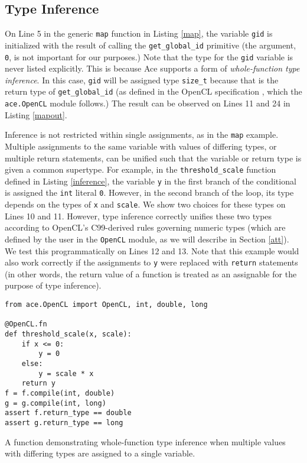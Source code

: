 \documentclass[10pt, conference, compsocconf]{IEEEtran}
\begin{document}
\subsection{Type Inference}
On Line 5 in the generic \verb|map| function in Listing \ref{map}, the variable \verb|gid| is initialized with the result of calling the \verb|get_global_id| primitive (the argument, \verb|0|, is not important for our purposes.)  Note that the type for the \verb|gid| variable is never listed explicitly. This is because Ace supports a form of {\em whole-function type inference}. In this case, \verb|gid| will be assigned type \verb|size_t| because that is the return type of \verb|get_global_id| (as defined in the OpenCL specification \cite{opencl}, which the \verb|ace.OpenCL| module follows.) The result can be observed on Lines 11 and 24 in Listing \ref{mapout}. 

Inference is not restricted within single assignments, as in the \verb|map| example. Multiple assignments to the same variable with values of differing types, or multiple return statements, can be unified such that the variable or return type is given a common supertype. For example, in the \verb|threshold_scale| function defined in Listing \ref{inference}, the variable \verb|y| in the first branch of the conditional is assigned the \verb|int| literal \verb|0|. However, in the second branch of the loop, its type depends on the types of \verb|x| and \verb|scale|. We show two choices for these types on Lines 10 and 11. However, type inference correctly unifies these two types according to OpenCL's C99-derived rules governing numeric types (which are defined by the user in the \verb|OpenCL| module, as we will describe in Section \ref{att}). We test this programmatically on Lines 12 and 13. Note that this example would also work correctly if the assignments to \verb|y| were replaced with \verb|return| statements (in other words, the return value of a function is treated as an assignable for the purpose of type inference).

\begin{codelisting}
\begin{lstlisting}
from ace.OpenCL import OpenCL, int, double, long

@OpenCL.fn
def threshold_scale(x, scale):
    if x <= 0:
        y = 0
    else:
        y = scale * x
    return y
f = f.compile(int, double)
g = g.compile(int, long)
assert f.return_type == double
assert g.return_type == long
\end{lstlisting}
\caption{A function demonstrating whole-function type inference when multiple values with differing types are assigned to a single variable.}
\label{inference}
\end{codelisting}
\end{document}
